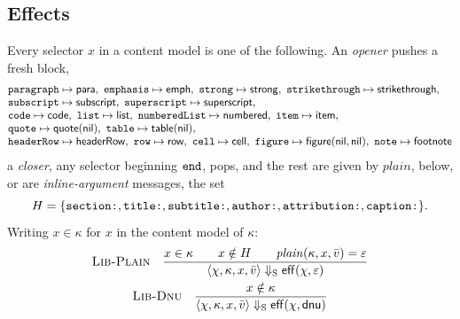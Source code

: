 \documentclass[11pt]{article}
\numberwithin{equation}{section}
\newcommand{\kw}[1]{\ensuremath{\mathsf{#1}}}
\newcommand{\str}[1]{\ensuremath{\text{\texttt{#1}}}}
\newcommand{\rulelabel}[1]{\textsc{#1}}
\begin{document}
\subsection{Effects}

Every selector $x$ in a content model is one of the following.  An
\emph{opener} pushes a fresh block,
\begin{equation}\label{eq:lib-openers}
\begin{array}{@{}l@{}}
\str{paragraph} \mapsto \kw{para},\
\str{emphasis} \mapsto \kw{emph},\
\str{strong} \mapsto \kw{strong},\
\str{strikethrough} \mapsto \kw{strikethrough}, \\
\str{subscript} \mapsto \kw{subscript},\
\str{superscript} \mapsto \kw{superscript}, \\
\str{code} \mapsto \kw{code},\
\str{list} \mapsto \kw{list},\
\str{numberedList} \mapsto \kw{numbered},\
\str{item} \mapsto \kw{item}, \\
\str{quote} \mapsto \kw{quote}(\kw{nil}),\
\str{table} \mapsto \kw{table}(\kw{nil}), \\
\str{headerRow} \mapsto \kw{headerRow},\
\str{row} \mapsto \kw{row},\
\str{cell} \mapsto \kw{cell},\
\str{figure} \mapsto \kw{figure}(\kw{nil}, \kw{nil}),\
\str{note} \mapsto \kw{footnote}
\end{array}
\end{equation}
a \emph{closer}, any selector beginning $\str{end}$, pops, and the rest
are given by $\mathit{plain}$, below, or are \emph{inline-argument}
messages, the set
\[
H = \{\str{section:}, \str{title:}, \str{subtitle:}, \str{author:},
\str{attribution:}, \str{caption:}\}.
\]  Writing $x \in \kappa$ for
$x$ in the content model of $\kappa$:
\begin{gather}
\label{eq:lib-plain}
\rulelabel{Lib-Plain}\quad
\frac{x \in \kappa \qquad x \notin H \qquad
      \mathit{plain}(\kappa, x, \bar v) = \varepsilon}
     {\langle \chi, \kappa, x, \bar v \rangle \Downarrow_{\mathrm{S}}
        \kw{eff}(\chi, \varepsilon)}
\\
\label{eq:lib-dnu}
\rulelabel{Lib-Dnu}\quad
\frac{x \notin \kappa}
     {\langle \chi, \kappa, x, \bar v \rangle \Downarrow_{\mathrm{S}}
        \kw{eff}(\chi, \kw{dnu})}
\end{gather}
\end{document}
